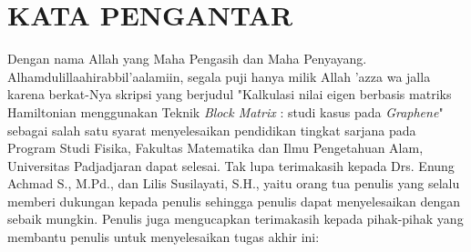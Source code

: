 \documentclass[12pt,a4paper]{report}
\begin{document}
\chapter*{\centering KATA PENGANTAR}
\thispagestyle{myplain}
 \hspace{5mm} 
 Dengan nama Allah yang Maha Pengasih dan Maha Penyayang. Alhamdulillaahirabbil'aalamiin, segala puji hanya milik Allah 'azza wa jalla karena berkat-Nya skripsi yang berjudul "Kalkulasi nilai eigen berbasis matriks Hamiltonian menggunakan Teknik \textit{Block Matrix} : studi kasus pada \textit{Graphene}" sebagai salah satu syarat menyelesaikan pendidikan tingkat sarjana pada Program Studi Fisika, Fakultas Matematika dan Ilmu Pengetahuan Alam, Universitas Padjadjaran dapat selesai. Tak lupa terimakasih kepada Drs. Enung Achmad S., M.Pd., dan Lilis Susilayati, S.H., yaitu orang tua penulis yang selalu memberi dukungan kepada penulis sehingga penulis dapat menyelesaikan dengan sebaik mungkin. Penulis juga mengucapkan terimakasih kepada pihak-pihak yang membantu penulis untuk menyelesaikan tugas akhir ini:
\end{document}
